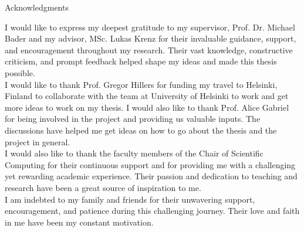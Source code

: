 \thispagestyle{empty}

\vspace*{20mm}

\begin{center}
    { Acknowledgments}
\end{center}

\vspace{10mm}

I would like to express my deepest gratitude to my supervisor, Prof. Dr. Michael Bader and my advisor, MSc. Lukas Krenz 
for their invaluable guidance, support, and encouragement throughout my research. 
Their vast knowledge, constructive criticism, and prompt feedback helped shape my ideas and made this thesis possible. \\

I would like to thank Prof. Gregor Hillers for funding my travel to Helsinki, Finland to collaborate with the team at University of Helsinki
to work and get more ideas to work on my thesis. I would also like to thank Prof. Alice Gabriel for being involved in the project and providing us valuable inputs.
The discussions have helped me get ideas on how to go about the thesis and the project in general.\\

I would also like to thank the faculty members of the Chair of Scientific Computing for their continuous support and for providing 
me with a challenging yet rewarding academic experience. Their passion and dedication to teaching and research have been a 
great source of inspiration to me. \\

I am indebted to my family and friends for their unwavering support, encouragement, and patience during this challenging 
journey. Their love and faith in me have been my constant motivation. \\

\cleardoublepage{}
